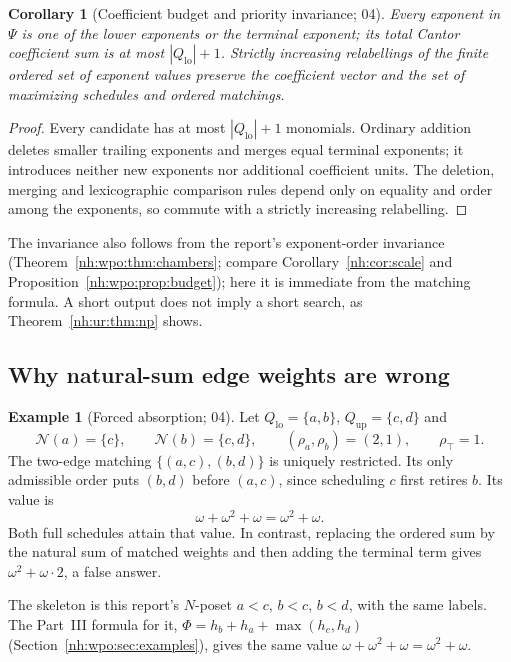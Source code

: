 \documentclass[11pt,a4paper]{article}
\newtheorem{corollary}[theorem]{Corollary}
\theoremstyle{definition}
\newtheorem{example}[theorem]{Example}
\theoremstyle{remark}
\newcommand{\Qlo}{Q_{\mathrm{lo}}}
\newcommand{\Qup}{Q_{\mathrm{up}}}
\newcommand{\Nb}{\mathcal N}
\newcommand{\rtop}{\rho_{\top}}
\begin{document}
\begin{corollary}[Coefficient budget and priority invariance; 04]\label{nh:ur:cor:budget}
Every exponent in $\Psi$ is one of the lower exponents or the terminal
exponent; its total Cantor coefficient sum is at most $|\Qlo|+1$. Strictly
increasing relabellings of the finite ordered set of exponent values preserve
the coefficient vector and the set of maximizing schedules and ordered
matchings.
\end{corollary}
\begin{proof}
Every candidate has at most $|\Qlo|+1$ monomials. Ordinary addition deletes
smaller trailing exponents and merges equal terminal exponents; it introduces
neither new exponents nor additional coefficient units. The deletion, merging
and lexicographic comparison rules depend only on equality and order among
the exponents, so commute with a strictly increasing relabelling.
\end{proof}
The invariance also follows from the report's exponent-order invariance
(Theorem~\ref{nh:wpo:thm:chambers}; compare Corollary~\ref{nh:cor:scale} and
Proposition~\ref{nh:wpo:prop:budget}); here it is immediate from the matching
formula. A short output does not imply a short search, as
Theorem~\ref{nh:ur:thm:np} shows.

\subsection{Why natural-sum edge weights are wrong}
\begin{example}[Forced absorption; 04]\label{nh:ur:ex:forced}
Let $\Qlo=\{a,b\}$, $\Qup=\{c,d\}$ and
\[
 \Nb(a)=\{c\},\qquad \Nb(b)=\{c,d\},\qquad
 (\rho_a,\rho_b)=(2,1),\qquad\rtop=1.
\]
The two-edge matching $\{(a,c),(b,d)\}$ is uniquely restricted. Its only
admissible order puts $(b,d)$ before $(a,c)$, since scheduling $c$ first
retires $b$. Its value is
\[
 \omega+\omega^2+\omega=\omega^2+\omega.
\]
Both full schedules attain that value. In contrast, replacing the ordered sum
by the natural sum of matched weights and then adding the terminal term gives
$\omega^2+\omega\cdot2$, a false answer.
\end{example}
The skeleton is this report's $N$-poset $a<c$, $b<c$, $b<d$, with the same
labels. The Part~III formula for it,
$\Phi=h_b+h_a+\max(h_c,h_d)$ (Section~\ref{nh:wpo:sec:examples}), gives the
same value $\omega+\omega^2+\omega=\omega^2+\omega$.
\end{document}
